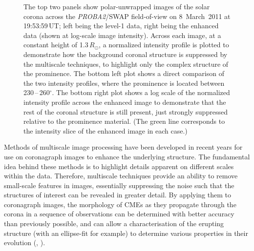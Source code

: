 \documentclass[namedreferences]{solarphysics}
\begin{document}
\begin{article}
\begin{figure}[t]
\caption{The top two panels show polar-unwrapped images of the solar corona across the \emph{PROBA2}/SWAP field-of-view on 8~March~2011 at 19:53:59\,UT; left being the level-1 data, right being the enhanced data (shown at log-scale image intensity). Across each image, at a constant height of 1.3\,$R_{\odot}$, a normalized intensity profile is plotted to demonstrate how the background coronal structure is suppressed by the multiscale techniques, to highlight only the complex structure of the prominence. The bottom left plot shows a direct comparison of the two intensity profiles, where the prominence is located between 230\,--\,260$^\circ$. The bottom right plot shows a log scale of the normalized intensity profile across the enhanced image to demonstrate that the rest of the coronal structure is still present, just strongly suppressed relative to the prominence material. (The green line corresponds to the intensity slice of the enhanced image in each case.)}
\label{polar_fig_swap_20110308}
\end{figure}

Methods of multiscale image processing have been developed in recent years for use on coronagraph images to enhance the underlying structure. The fundamental idea behind these methods is to highlight details apparent on different scales within the data. Therefore, multiscale techniques provide an ability to remove small-scale features in images, essentially suppressing the noise such that the structures of interest can be revealed in greater detail. By applying them to coronagraph images, the morphology of CMEs as they propagate through the corona in a sequence of observations can be determined with better accuracy than previously possible, and can allow a characterisation of the erupting structure (with an ellipse-fit for example) to determine various properties in their evolution (, \citeyear{2012ApJ...752..145B}). %


\end{article}
\end{document}
